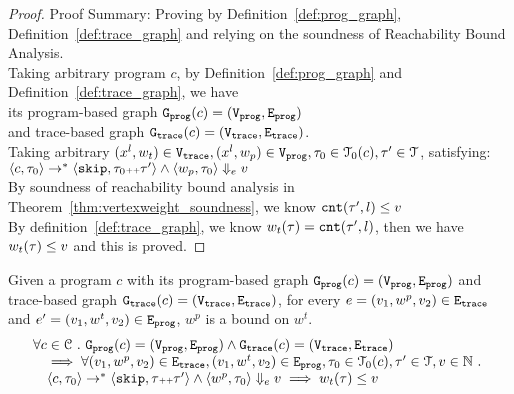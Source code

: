\begin{proof}
Proof Summary: Proving by Definition~\ref{def:prog_graph}, Definition~\ref{def:trace_graph} and relying on the soundness of Reachability Bound 
Analysis.
\\
Taking arbitrary program $c$,
by Definition~\ref{def:prog_graph} and Definition~\ref{def:trace_graph}, 
we have   
\\
its program-based graph $\mathtt{{G_{prog}}}({c}) = (\mathtt{{V_{prog}}}, \mathtt{{E_{prog}}})$ 
\\
and 
trace-based graph $\mathtt{{G_{trace}}}({c}) = (\mathtt{{V_{trace}}}, \mathtt{{E_{trace}}})$.
\\
Taking arbitrary 
$(x^l, w_{t}) \in \mathtt{{V_{trace}}}, (x^l, w_{p}) \in \mathtt{{V_{prog}}}, \mathtt{\tau}_0 \in \mathcal{T}_0(c), \mathtt{\tau}' \in \mathcal{T}$, satisfying:
\\
$\langle {c}, \mathtt{\tau}_0 \rangle \to^{*} \langle \mathtt{skip}, \mathtt{\tau}_0 {\scriptscriptstyle ++}\mathtt{\tau}' \rangle 
\land 
\langle w_{p}, \mathtt{\tau}_0 \rangle \Downarrow_e v$
\\
By soundness of reachability bound analysis in Theorem~\ref{thm:vertexweight_soundness}, we know 
$\mathtt{cnt}(\mathtt{\tau}', l) \leq v$
\\
By definition~\ref{def:trace_graph}, we know $w_t(\mathtt{\tau}) = \mathtt{cnt}(\mathtt{\tau}', l)$,
then we have $w_t(\mathtt{\tau}) \leq v$ and this is proved.
\end{proof}
%
\begin{lem}
	\label{lem:edgeweights_map}
	Given a program $c$ with its
	program-based graph $\mathtt{{G_{prog}}}({c}) = (\mathtt{{V_{prog}}}, \mathtt{{E_{prog}}})$
	and 
	trace-based graph $\mathtt{{G_{trace}}}({c}) = (\mathtt{{V_{trace}}}, \mathtt{{E_{trace}}})$,
	for every $e = (v_1, w^p, v_2) \in \mathtt{{E_{trace}}}$ and
	$e' = (v_1, w^t, v_2) \in \mathtt{{E_{prog}}}$, 
	$w^{p}$ is a bound on $w^t$.
	\[
		\begin{array}{l}
			\forall c \in \mathcal{C} 
			 ~.~ 
			 \mathtt{{G_{prog}}}({c}) = (\mathtt{{V_{prog}}}, \mathtt{{E_{prog}}})
			\land 
			\mathtt{{G_{trace}}}({c}) = (\mathtt{{V_{trace}}}, \mathtt{{E_{trace}}})
			\\ \quad
			\implies
			\forall (v_1, w^p, v_2) \in \mathtt{{E_{trace}}},
			(v_1, w^t, v_2) \in \mathtt{{E_{prog}}}, 
			\mathtt{\tau}_0 \in \mathcal{T}_0(c), 
			\mathtt{\tau}' \in \mathcal{T}, v \in \mathbb{N} ~.~
			\\ \quad
			\langle {c}, \mathtt{\tau}_0 \rangle \to^{*} \langle \mathtt{skip}, \mathtt{\tau}{\scriptscriptstyle ++}\mathtt{\tau}' \rangle 
			\land 
			\langle w^{p}, \mathtt{\tau}_0 \rangle \Downarrow_e v
			\implies
			w_{t}(\mathtt{\tau}) \leq v
		\end{array}
		\]
	\end{lem}
